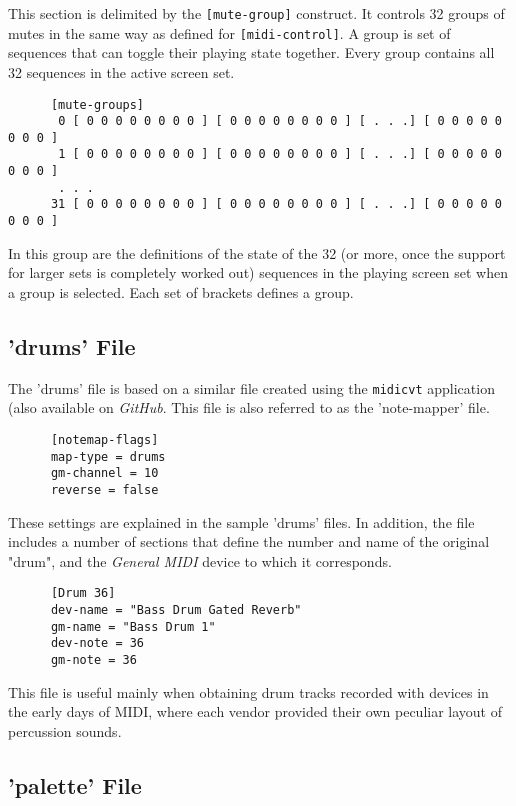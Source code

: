    This section is delimited by the \texttt{[mute-group]} construct.
   It controls 32 groups of mutes in the same way as defined for
   \texttt{[midi-control]}. A group is set of sequences that can toggle their
   playing state together.  Every group contains all 32 sequences in the
   active screen set.

   \begin{verbatim}
      [mute-groups]
       0 [ 0 0 0 0 0 0 0 0 ] [ 0 0 0 0 0 0 0 0 ] [ . . .] [ 0 0 0 0 0 0 0 0 ]
       1 [ 0 0 0 0 0 0 0 0 ] [ 0 0 0 0 0 0 0 0 ] [ . . .] [ 0 0 0 0 0 0 0 0 ]
       . . .
      31 [ 0 0 0 0 0 0 0 0 ] [ 0 0 0 0 0 0 0 0 ] [ . . .] [ 0 0 0 0 0 0 0 0 ]
   \end{verbatim}

   In this group are the definitions of the state of the 32 (or more, once the
   support for larger sets is completely worked out) sequences
   in the playing screen set when a group is selected.
   Each set of brackets defines a group.

\subsection{'drums' File}
\label{subsec:configuration_drums}

   The 'drums' file is based on a similar file created using the
   \texttt{midicvt} application (also available on \textsl{GitHub}.  This file
   is also referred to as the 'note-mapper' file.

   \begin{verbatim}
      [notemap-flags]
      map-type = drums
      gm-channel = 10
      reverse = false
   \end{verbatim}

   These settings are explained in the sample 'drums' files.  In addition, the
   file includes a number of sections that define the number and name of the
   original "drum", and the \textsl{General MIDI} device to which it
   corresponds.

   \begin{verbatim}
      [Drum 36]
      dev-name = "Bass Drum Gated Reverb"
      gm-name = "Bass Drum 1"
      dev-note = 36
      gm-note = 36
   \end{verbatim}

   This file is useful mainly when obtaining drum tracks recorded with devices in
   the early days of MIDI, where each vendor provided their own peculiar layout of
   percussion sounds.

\subsection{'palette' File}
\label{subsec:configuration_palette}

